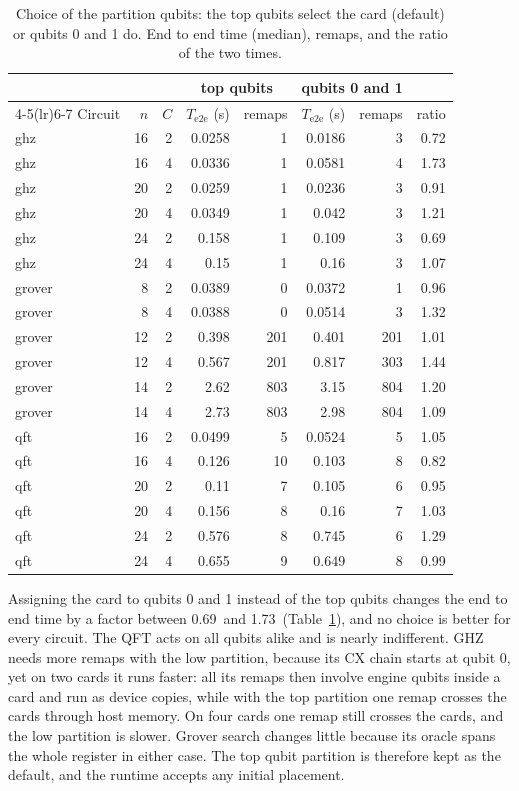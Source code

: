 \documentclass[pdflatex,sn-mathphys-num]{sn-jnl}
\newcommand{\NumPartRatioMax}{1.73}
\newcommand{\NumPartRatioMin}{0.69}
\theoremstyle{thmstyleone}
\theoremstyle{thmstylethree}
\begin{document}
\begin{table}[t]
\caption{Choice of the partition qubits: the top qubits select the card (default) or qubits 0 and 1 do. End to end
time (median), remaps, and the ratio of the two times.}\label{tab:part}
\begin{tabular}{@{}lrrrrrrr@{}}
\toprule
 & & & \multicolumn{2}{c}{top qubits} & \multicolumn{2}{c}{qubits 0 and 1} & \\
\cmidrule(lr){4-5}\cmidrule(lr){6-7}
Circuit & $n$ & $C$ & $T_{\mathrm{e2e}}$ (s) & remaps & $T_{\mathrm{e2e}}$ (s) & remaps & ratio \\
\midrule
ghz & 16 & 2 & 0.0258 & 1 & 0.0186 & 3 & 0.72 \\
ghz & 16 & 4 & 0.0336 & 1 & 0.0581 & 4 & 1.73 \\
ghz & 20 & 2 & 0.0259 & 1 & 0.0236 & 3 & 0.91 \\
ghz & 20 & 4 & 0.0349 & 1 & 0.042 & 3 & 1.21 \\
ghz & 24 & 2 & 0.158 & 1 & 0.109 & 3 & 0.69 \\
ghz & 24 & 4 & 0.15 & 1 & 0.16 & 3 & 1.07 \\
grover & 8 & 2 & 0.0389 & 0 & 0.0372 & 1 & 0.96 \\
grover & 8 & 4 & 0.0388 & 0 & 0.0514 & 3 & 1.32 \\
grover & 12 & 2 & 0.398 & 201 & 0.401 & 201 & 1.01 \\
grover & 12 & 4 & 0.567 & 201 & 0.817 & 303 & 1.44 \\
grover & 14 & 2 & 2.62 & 803 & 3.15 & 804 & 1.20 \\
grover & 14 & 4 & 2.73 & 803 & 2.98 & 804 & 1.09 \\
qft & 16 & 2 & 0.0499 & 5 & 0.0524 & 5 & 1.05 \\
qft & 16 & 4 & 0.126 & 10 & 0.103 & 8 & 0.82 \\
qft & 20 & 2 & 0.11 & 7 & 0.105 & 6 & 0.95 \\
qft & 20 & 4 & 0.156 & 8 & 0.16 & 7 & 1.03 \\
qft & 24 & 2 & 0.576 & 8 & 0.745 & 6 & 1.29 \\
qft & 24 & 4 & 0.655 & 9 & 0.649 & 8 & 0.99 \\
\bottomrule
\end{tabular}
\end{table}

Assigning the card to qubits 0 and 1 instead of the top qubits changes the end to end time by a factor between
\NumPartRatioMin~and \NumPartRatioMax~(Table~\ref{tab:part}), and no choice is better for every circuit. The QFT acts on
all qubits alike and is nearly indifferent. GHZ needs more remaps with the low partition, because its CX chain starts at
qubit 0, yet on two cards it runs faster: all its remaps then involve engine qubits inside a card and run as device
copies, while with the top partition one remap crosses the cards through host memory. On four cards one remap still
crosses the cards, and the low partition is slower.
Grover search changes little because its oracle spans the whole register in either case. The top qubit partition is
therefore kept as the default, and the runtime accepts any initial placement.
\end{document}
